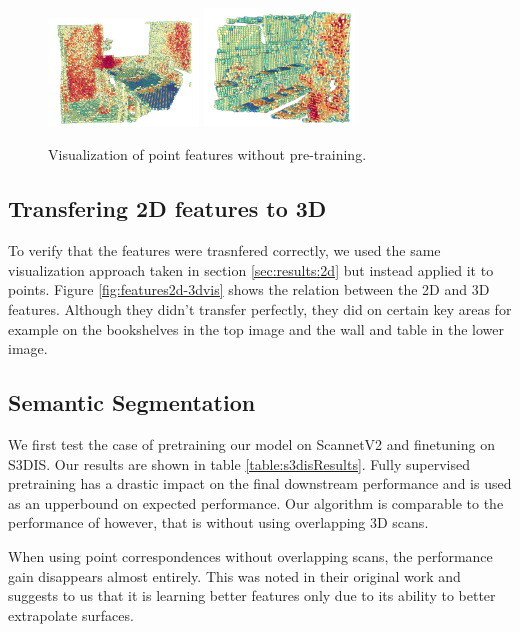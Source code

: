 \documentclass[10pt,twocolumn,letterpaper]{article}
\begin{document}
\begin{figure}
    \centering
    \includegraphics[width=4cm]{images/experiments/scratch-3d.png}
    \includegraphics[width=4cm]{images/experiments/scratch-3d-2.png}
    \caption{Visualization of point features without pre-training.}
    \label{fig:features2dScratchvis}
\end{figure}

\subsection{Transfering 2D features to 3D}
\label{sec:results:2d3d}

To verify that the features were trasnfered correctly, we used the same visualization approach taken in section \ref{sec:results:2d} but instead applied it to points. Figure \ref{fig:features2d-3dvis} shows the relation between the 2D and 3D features. Although they didn't transfer perfectly, they did on certain key areas for example on the bookshelves in the top image and the wall and table in the lower image.

\subsection{Semantic Segmentation}
\label{sec:results:3d}

We first test the case of pretraining our model on ScannetV2 and finetuning on S3DIS. Our results are shown in table \ref{table:s3disResults}. Fully supervised pretraining has a drastic impact on the final downstream performance and is used as an upperbound on expected performance. Our algorithm is comparable to the performance of \cite{xie2020pointcontrast} however, that is without using overlapping 3D scans.

When using point correspondences without overlapping scans, the performance gain disappears almost entirely. This was noted in their original work and suggests to us that it is learning better features only due to its ability to better extrapolate surfaces.
\end{document}
